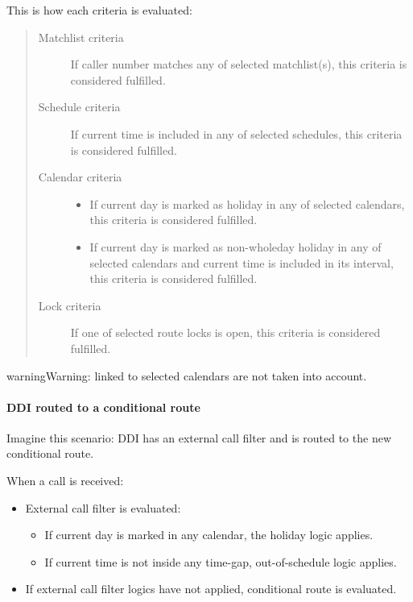 \documentclass[letterpaper,10pt,english]{sphinxmanual}
\begin{document}
This is how each criteria is evaluated:
\begin{quote}
\begin{description}
\item[{Matchlist criteria}] \leavevmode
If caller number matches any of selected matchlist(s), this criteria is considered fulfilled.

\item[{Schedule criteria}] \leavevmode
If current time is included in any of selected schedules, this criteria is considered fulfilled.

\item[{Calendar criteria}] \leavevmode\begin{itemize}
\item {} 
If current day is marked as holiday in any of selected calendars, this criteria is considered fulfilled.

\item {} 
If current day is marked as non-wholeday holiday in any of selected calendars and current time is included
in its interval, this criteria is considered fulfilled.

\end{itemize}

\item[{Lock criteria}] \leavevmode
If one of selected route locks is open, this criteria is considered fulfilled.

\end{description}
\end{quote}

\begin{notice}{warning}{Warning:}
{\hyperref[administration_portal/client/vpbx/routing_tools/calendars:special\string-schedules]{}} linked to selected calendars are not taken into account.
\end{notice}


\paragraph{DDI routed to a conditional route}
\label{administration_portal/client/vpbx/routing_endpoints/conditional_routes:ddi-routed-to-a-conditional-route}
Imagine this scenario: DDI has an external call filter and is routed to the new conditional route.

When a call is received:
\begin{itemize}
\item {} 
External call filter is evaluated:
\begin{itemize}
\item {} 
If current day is marked in any calendar, the holiday logic applies.

\item {} 
If current time is not inside any time-gap, out-of-schedule logic applies.

\end{itemize}

\item {} 
If external call filter logics have not applied, conditional route is evaluated.

\end{itemize}
\end{document}
